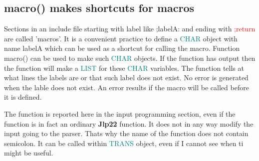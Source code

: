 \subsection{\textcolor{VioletRed}{macro}() makes shortcuts for macros} 
\label{macro} 
Sections in an include file starting with label like ;labelA: and 
ending with \textcolor{Red}{;return} are called 'macros'. It is a convenient practice to 
define a \textcolor{teal}{CHAR} object with name labelA which can be used as a shortcut for calling the macro. 
Function \textcolor{VioletRed}{macro}()  can be used to make such \textcolor{teal}{CHAR} objects. 
If the function has output then the function will make a \textcolor{teal}{LIST} for these \textcolor{teal}{CHAR} variables. 
The function tells at what lines the labels are or that such label does not exist. 
No error is generated when the lable does not exist. An error results if the macro 
will be called before it is defined. 
\begin{note} 
The function is reported here in the input programming section, even if the 
function is in fact an ordinary \textbf{Jlp22} function. It does not in any way modify 
the input going to the parser. Thats why the name of the function does not contain 
semicolon. It can be called within \textcolor{teal}{TRANS} object, even if I cannot see when ti might be useful. 
\end{note} 
